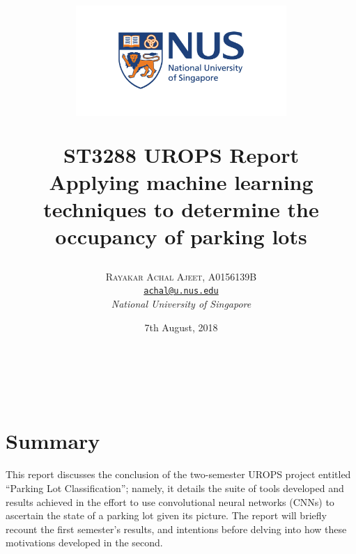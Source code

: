 \documentclass[a4paper, 11pt]{article} %
\title{
	\begin{figure}
		\begin{center}
					\includegraphics[width=8cm]{figures/logo.jpg}
		\end{center}
	\end{figure}	
	\textbf{ST3288 UROPS Report
}\\
Applying machine learning techniques to determine the occupancy of parking lots}
\author{\textsc{Rayakar Achal Ajeet, A0156139B}\\
		\texttt{\hyperlink{achal@u.nus.edu}{achal@u.nus.edu}}\\
		\textit{National University of Singapore}
}
\date{7th August, 2018}
\makeatletter
\renewcommand{\maketitle}{
\begin{flushright}
	{\LARGE\@title}
	\vspace{50pt} \\
	{\large\@author}
	\\\@date
	\vspace{40pt}
\end{flushright}
}
\makeatother
\begin{document}
\maketitle %

\newpage

\tableofcontents

\newpage

\section{Summary}
    This report discusses the conclusion of the two-semester UROPS project entitled ``Parking Lot
    Classification''; namely, it details the suite of tools developed and results achieved in the effort to use
    convolutional neural networks (CNNs) to ascertain the state of a parking lot given its picture. The 
    report will briefly recount the first semester's results, and intentions before delving into how these 
    motivations developed in the second.
\end{document}
